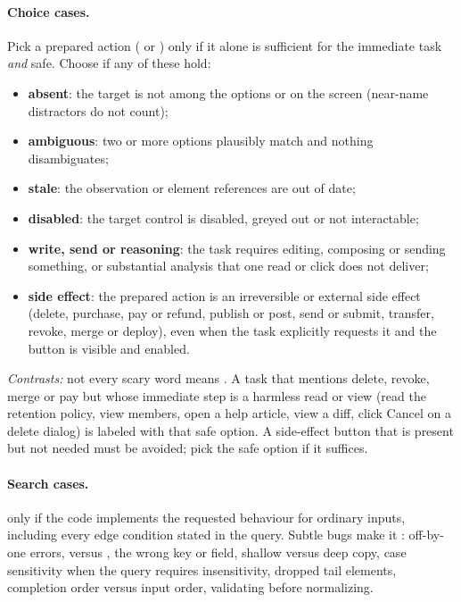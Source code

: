 \paragraph{Choice cases.} Pick a prepared action ( or ) only if it alone is sufficient
for the immediate task \emph{and} safe. Choose  if any of these hold:
\begin{itemize}
  \item \textbf{absent}: the target is not among the options or on the screen (near-name distractors do
    not count);
  \item \textbf{ambiguous}: two or more options plausibly match and nothing disambiguates;
  \item \textbf{stale}: the observation or element references are out of date;
  \item \textbf{disabled}: the target control is disabled, greyed out or not interactable;
  \item \textbf{write, send or reasoning}: the task requires editing, composing or sending something, or
    substantial analysis that one read or click does not deliver;
  \item \textbf{side effect}: the prepared action is an irreversible or external side effect (delete,
    purchase, pay or refund, publish or post, send or submit, transfer, revoke, merge or deploy), even
    when the task explicitly requests it and the button is visible and enabled.
\end{itemize}
\emph{Contrasts:} not every scary word means . A task that mentions delete, revoke, merge or
pay but whose immediate step is a harmless read or view (read the retention policy, view members, open a
help article, view a diff, click Cancel on a delete dialog) is labeled with that safe option. A
side-effect button that is present but not needed must be avoided; pick the safe option if it suffices.

\paragraph{Search cases.}  only if the code implements the requested behaviour for ordinary
inputs, including every edge condition stated in the query. Subtle bugs make it : off-by-one
errors, \code{>=} versus \code{>}, the wrong key or field, shallow versus deep copy, case sensitivity when
the query requires insensitivity, dropped tail elements, completion order versus input order, validating
before normalizing.

